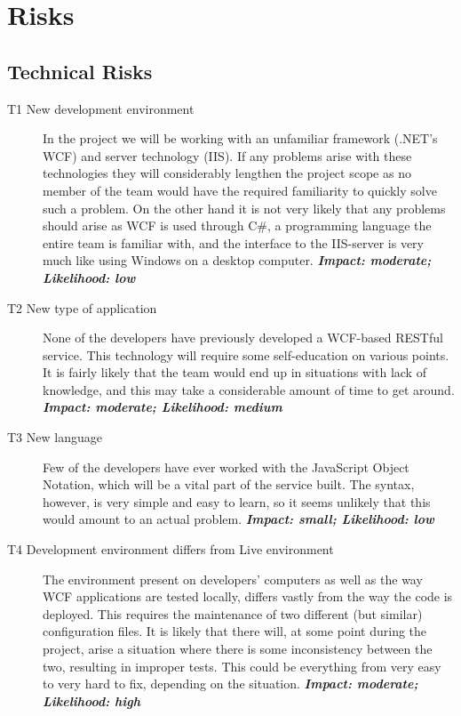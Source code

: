 \section{Risks}
\label{app:risks-appendix}

\subsection{Technical Risks}
\begin{description}
    \item[T1 New development environment] In the project we will be working with an unfamiliar
        framework (.NET’s WCF) and server technology (IIS). If any problems arise with these
        technologies they will considerably lengthen the project scope as no member of the team
        would have the required familiarity to quickly solve such a problem. On the other hand
        it is not very likely that any problems should arise as WCF is used through C\#, a
        programming language the entire team is familiar with, and the interface to the IIS-server
        is very much like using Windows on a desktop computer.\newline
        \textbf{\emph{Impact: moderate; Likelihood: low}}
    \item[T2 New type of application] None of the developers have previously developed a WCF-based
        RESTful service. This technology will require some self-education on various points. It is
        fairly likely that the team would end up in situations with lack of knowledge, and this may
        take a considerable amount of time to get around.\newline
        \textbf{\emph{Impact: moderate; Likelihood: medium}}
    \item[T3 New language] Few of the developers have ever worked with the JavaScript Object Notation,
        which will be a vital part of the service built. The syntax, however, is very simple and easy
        to learn, so it seems unlikely that this would amount to an actual problem.\newline
        \textbf{\emph{Impact: small; Likelihood: low}}
    \item[T4 Development environment differs from Live environment] The environment present on
        developers' computers as well as the way WCF applications are tested locally, differs vastly
        from the way the code is deployed. This requires the maintenance of two different (but similar)
        configuration files. It is likely that there will, at some point during the project, arise a
        situation where there is some inconsistency between the two, resulting in improper tests. This
        could be everything from very easy to very hard to fix, depending on the situation.\newline
        \textbf{\emph{Impact: moderate; Likelihood: high}}
\end{description}

